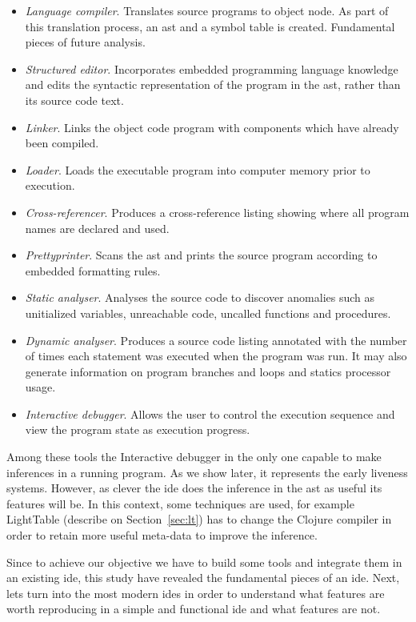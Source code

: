 \begin{itemize}
 \item \textit{Language compiler}. Translates source programs to object node. As part of this translation process, an \ac{ast} and a symbol table is created. Fundamental pieces of future analysis.
 \item \textit{Structured editor}. Incorporates embedded programming language knowledge and edits the syntactic representation of the program in the \ac{ast}, rather than its source code text.
 \item \textit{Linker}. Links the object code program with components which have already been compiled.
 \item \textit{Loader}. Loads the executable program into computer memory prior to execution.
 \item \textit{Cross-referencer}. Produces a cross-reference listing showing where all program names are declared and used.
 \item \textit{Prettyprinter}. Scans the \ac{ast} and prints the source program according to embedded formatting rules.
 \item \textit{Static analyser}. Analyses the source code to discover anomalies such as unitialized variables, unreachable code, uncalled functions and procedures.
 \item \textit{Dynamic analyser}. Produces a source code listing annotated with the number of times each statement was executed when the program was run. It may also generate information on program branches and loops and statics processor usage.
 \item \textit{Interactive debugger}. Allows the user to control the execution sequence and view the program state as execution progress.
\end{itemize}

Among these tools the Interactive debugger in the only one capable to make inferences in a running program. As we show later, it represents the early liveness systems. However, as clever the \ac{ide} does the inference in the \ac{ast} as useful its features will be. In this context, some techniques are used, for example LightTable (describe on Section~\ref{sec:lt}) has to change the Clojure compiler in order to retain more useful meta-data to improve the inference. 

Since to achieve our objective we have to build some tools and integrate them in an existing \ac{ide}, this study have revealed the fundamental pieces of an \ac{ide}. Next, lets turn into the most modern \ac{ide}s in order to understand what features are worth reproducing in a simple and functional \ac{ide} and what features are not.

